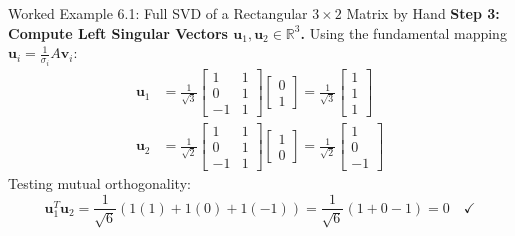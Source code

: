 \begin{examplebox}[breakable]{Worked Example 6.1: Full SVD of a Rectangular $3 \times 2$ Matrix by Hand}
\textbf{Step 3: Compute Left Singular Vectors $\mathbf{u}_1, \mathbf{u}_2 \in \mathbb{R}^3$.}
Using the fundamental mapping $\mathbf{u}_i = \frac{1}{\sigma_i} A \mathbf{v}_i$:
\begin{align}
\mathbf{u}_1 &= \frac{1}{\sqrt{3}} \begin{bmatrix} 1 & 1 \\ 0 & 1 \\ -1 & 1 \end{bmatrix} \begin{bmatrix} 0 \\ 1 \end{bmatrix} = \frac{1}{\sqrt{3}} \begin{bmatrix} 1 \\ 1 \\ 1 \end{bmatrix} \\
\mathbf{u}_2 &= \frac{1}{\sqrt{2}} \begin{bmatrix} 1 & 1 \\ 0 & 1 \\ -1 & 1 \end{bmatrix} \begin{bmatrix} 1 \\ 0 \end{bmatrix} = \frac{1}{\sqrt{2}} \begin{bmatrix} 1 \\ 0 \\ -1 \end{bmatrix}
\end{align}
Testing mutual orthogonality:
\begin{equation}
\mathbf{u}_1^T \mathbf{u}_2 = \frac{1}{\sqrt{6}}(1(1) + 1(0) + 1(-1)) = \frac{1}{\sqrt{6}}(1 + 0 - 1) = 0 \quad \checkmark
\end{equation}


\end{examplebox}
